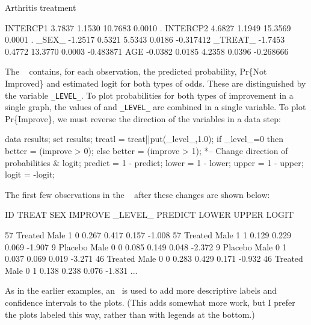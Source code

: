 \begin{Example}[arthrit12]{Arthritis treatment}
\begin{Output}[htb]
\begin{output}
   INTERCP1     3.7837    1.1530     10.7683      0.0010            .
   INTERCP2     4.6827    1.1949     15.3569      0.0001            .
   _SEX_       -1.2517    0.5321      5.5343      0.0186    -0.317412
   _TREAT_     -1.7453    0.4772     13.3770      0.0003    -0.483871
   AGE         -0.0382    0.0185      4.2358      0.0396    -0.268666
\end{output}
\end{Output}

The \ODS\  contains, for each observation, the
predicted probability, Pr\{Not Improved\} and estimated logit for both
types of odds.  These are distinguished by the variable
\verb|_LEVEL_|.  To plot probabilities for both types of improvement in a
single graph, the values of  and \verb|_LEVEL_| are combined
in a single variable.  To plot Pr\{Improve\}, we must reverse the
direction of the variables in a data step:

\begin{listing}
data results;
   set results;
   treatl = treat||put(_level_,1.0);
   if _level_=0 then better = (improve > 0);
                else better = (improve > 1);
   *-- Change direction of probabilities \& logit;
   predict = 1 - predict;
   lower = 1 - lower;
   upper = 1 - upper;
   logit = -logit;
\end{listing}

The first few observations in the \Dset\  after these
changes are shown below:

\begin{output}
   ID  TREAT   SEX IMPROVE _LEVEL_ PREDICT   LOWER   UPPER   LOGIT

   57 Treated Male    1       0      0.267   0.417   0.157  -1.008
   57 Treated Male    1       1      0.129   0.229   0.069  -1.907
    9 Placebo Male    0       0      0.085   0.149   0.048  -2.372
    9 Placebo Male    0       1      0.037   0.069   0.019  -3.271
   46 Treated Male    0       0      0.283   0.429   0.171  -0.932
   46 Treated Male    0       1      0.138   0.238   0.076  -1.831
     ...
\end{output}

As in the earlier examples, an \ADS\ is used to add more
descriptive labels and confidence intervals to the plots.  (This adds
somewhat more work, but I prefer the plots labeled this way, rather
than with legends at the bottom.)


\end{Example}
